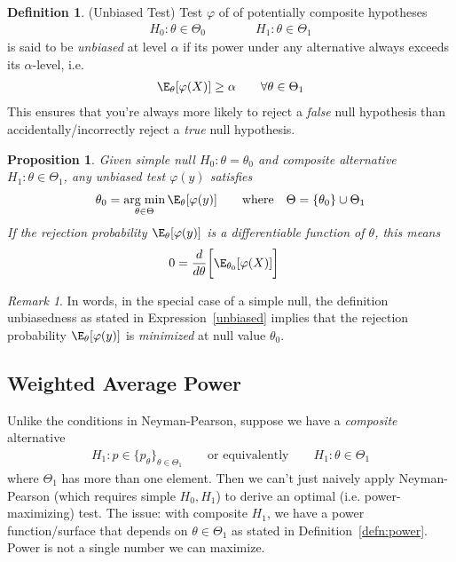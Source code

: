 \documentclass[12pt]{article}
\theoremstyle{plain}
\newtheorem{prop}[thm]{Proposition}
\theoremstyle{definition}
\newtheorem{defn}[thm]{Definition}
\theoremstyle{remark}
\newtheorem*{rmk}{Remark}
\DeclareMathOperator*{\argmin}{arg\;min}
\begin{document}
\begin{defn}(Unbiased Test)
Test $\varphi$ of of potentially composite hypotheses
\begin{align*}
  H_0:\theta\in\Theta_0
  \qquad\qquad
  H_1:\theta\in\Theta_1
\end{align*}
is said to be \emph{unbiased} at level $\alpha$ if its power under any
alternative always exceeds its $\alpha$-level, i.e.
\begin{align}
  \E_{\theta}[\varphi(X)]
  \geq \alpha
  \qquad\forall \theta\in\Theta_1
  \label{unbiased}
\end{align}
This ensures that you're always more likely to reject a \emph{false}
null hypothesis than accidentally/incorrectly reject a \emph{true} null
hypothesis.
\end{defn}

\begin{prop}
Given simple null $H_0:\theta=\theta_0$ and composite alternative
$H_1:\theta\in\Theta_1$, any unbiased test $\varphi(y)$
satisfies
\begin{align*}
  \theta_0
  =
  \argmin_{\theta\in\Theta}
  \E_\theta[\varphi(y)]
  \qquad \text{where}\quad
  \Theta=\{\theta_0\}\cup\Theta_1
\end{align*}
If the rejection probability $\E_\theta[\varphi(y)]$ is a differentiable
function of $\theta$, this means
\begin{align*}
  0
  &=
  \frac{d}{d\theta}
  \bigg[
  \E_{\theta_0}[\varphi(X)]
  \bigg]
\end{align*}
\end{prop}
\begin{rmk}
In words, in the special case of a simple null, the definition
unbiasedness as stated in Expression~\ref{unbiased} implies that the
rejection probability $\E_\theta[\varphi(y)]$ is \emph{minimized} at
null value $\theta_0$.
\end{rmk}


\clearpage
\subsection{Weighted Average Power}

Unlike the conditions in Neyman-Pearson, suppose we have a
\emph{composite} alternative
\begin{align}
  H_1:p\in\{p_\theta\}_{\theta\in\Theta_1}
  \qquad \text{or equivalently}\qquad
  H_1: \theta\in\Theta_1
  \label{wapalt}
\end{align}
where $\Theta_1$ has more than one element.
Then we can't just naively apply Neyman-Pearson (which requires simple
$H_0,H_1$) to derive an optimal (i.e. power-maximizing) test.
The issue: with composite $H_1$, we have a power function/surface that
depends on $\theta\in\Theta_1$ as stated in Definition~\ref{defn:power}.
Power is not a single number we can maximize.
\end{document}
